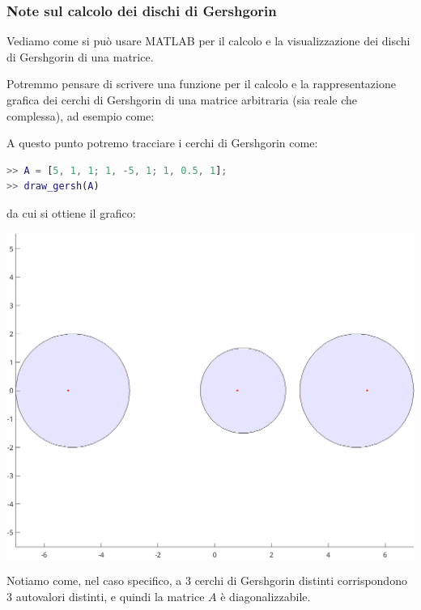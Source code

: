 \documentclass[a4paper,11pt]{article}
\begin{document}
\subsubsection{Note sul calcolo dei dischi di Gershgorin}
Vediamo come si può usare MATLAB per il calcolo e la visualizzazione dei dischi di Gershgorin di una matrice.

Potremmo pensare di scrivere una funzione per il calcolo e la rappresentazione grafica dei cerchi di Gershgorin di una matrice arbitraria (sia reale che complessa), ad esempio come:
\lstset{style=codestyle, language=matlab}


A questo punto potremo tracciare i cerchi di Gershgorin come:
\begin{lstlisting}[language=matlab, style=codestyle]	
>> A = [5, 1, 1; 1, -5, 1; 1, 0.5, 1];
>> draw_gersh(A)
\end{lstlisting}
da cui si ottiene il grafico:
\begin{center}
\includegraphics{../figures/gersh.png}
\end{center}

Notiamo come, nel caso specifico, a 3 cerchi di Gershgorin distinti corrispondono 3 autovalori distinti, e quindi la matrice $A$ è diagonalizzabile.
\end{document}
